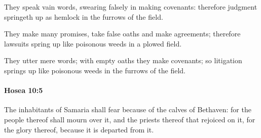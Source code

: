 			\begin{versebox}
					\item[BHS] 
					\item[LXX] 
					\item[ASV] They speak vain words, swearing falsely in making covenants: therefore judgment springeth up as hemlock in the furrows of the field.
					\item[NIV] They make many promises, take false oaths and make agreements; therefore lawsuits spring up like poisonous weeds in a plowed field.
					\item[NRSV] They utter mere words; with empty oaths they make covenants; so litigation springs up like poisonous weeds in the furrows of the field.
			\end{versebox}

		\paragraph{Hosea 10:5} %
			\label{HOSEA-10-5}

			The inhabitants of Samaria shall fear because of the calves of Bethaven: for the people thereof shall mourn over it, and the priests thereof that rejoiced on it, for the glory thereof, because it is departed from it.

